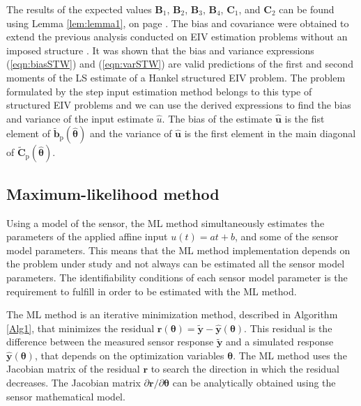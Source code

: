 The results of the expected values $\mathbf{B}_1$, $\mathbf{B}_2$, $\mathbf{B}_3$, $\mathbf{B}_4$, $\mathbf{C}_1$, and $\mathbf{C}_2$ can be found using Lemma \ref{lem:lemma1}, on page \pageref{lem:lemma1}.
The bias and covariance were obtained to extend the previous analysis conducted on EIV estimation problems without an imposed structure \citep{Vaccaro94, Stewart90SPT}.
It was shown that the bias and variance expressions (\ref{eqn:biasSTW}) and (\ref{eqn:varSTW}) are valid predictions of the first and second moments of the LS estimate of a Hankel structured EIV problem.
The problem formulated by the step input estimation method belongs to this type of structured EIV problems and we can use the derived expressions to find the bias and variance of the input estimate $\widehat{u}$.
The bias of the estimate $\widehat{\mathbf{u}}$ is the fist element of $\widetilde{\mathbf{b}}_{\mathrm{p}} \left( \widehat{\bm{\theta}} \right)$ and the variance of $\widehat{\mathbf{u}}$ is the first element in the main diagonal of $\widetilde{\mathbf{C}}_{\mathrm{p}} \left( \widehat{\bm{\theta}} \right)$.


\subsection{Maximum-likelihood method}
Using a model of the sensor, the ML method simultaneously estimates the parameters of the applied affine input $u(t) = at + b$, and some of the sensor model parameters.
This means that the ML method implementation depends on the problem under study and not always can be estimated all the sensor model parameters.  
The identifiability conditions of each sensor model parameter is the requirement to fulfill in order to be estimated with the ML method. %

The ML method is an iterative minimization method, described in Algorithm \ref{Alg1}, that minimizes the residual $\mathbf{r}(\bm{\theta}) = \widetilde{\mathbf{y}} - \widehat{\mathbf{y}}(\bm{\theta})$.
This residual is the difference between the measured sensor response $\widetilde{\mathbf{y}}$ and a simulated response $\widehat{\mathbf{y}}(\bm{\theta})$, that depends on the optimization variables $\bm{\theta}$.
The ML method uses the Jacobian matrix of the residual $\mathbf{r}$ to search the direction in which the residual decreases.
The Jacobian matrix $\partial \mathbf{r} / \partial \bm{\theta}$ can be analytically obtained using the sensor mathematical model.


